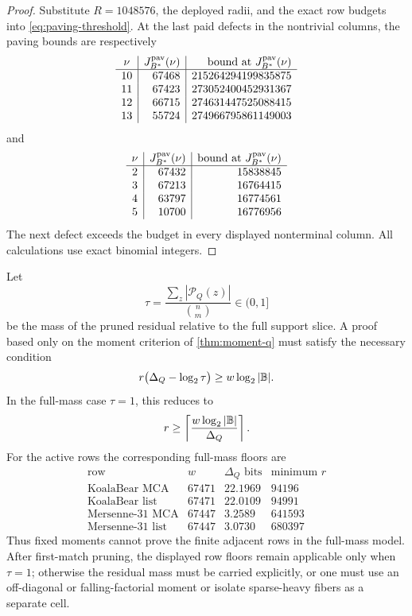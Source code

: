 \documentclass[11pt,a4paper]{amsart}
\numberwithin{equation}{section}
\theoremstyle{remark}
\begin{document}
\begin{proof}
Substitute \(R=1048576\), the deployed radii, and the exact row budgets
into \eqref{eq:paving-threshold}.  At the last paid defects in the nontrivial
columns, the paving bounds are respectively
\[
\begin{array}{c|r|r}
\nu&J_{B^*}^{\rm pav}(\nu)&\text{bound at }J_{B^*}^{\rm pav}(\nu)\\ \hline
10&67468&215264294199835875\\
11&67423&273052400452931367\\
12&66715&274631447525088415\\
13&55724&274966795861149003
\end{array}
\]
and
\[
\begin{array}{c|r|r}
\nu&J_{B^*}^{\rm pav}(\nu)&\text{bound at }J_{B^*}^{\rm pav}(\nu)\\ \hline
2&67432&15838845\\
3&67213&16764415\\
4&63797&16774561\\
5&10700&16776956
\end{array}
\]
The next defect exceeds the budget in every displayed nonterminal column.
All calculations use exact binomial integers.
\end{proof}

\begin{proposition}\label{prop:q-moment-order-floor}
Let
\[
        \tau=\frac{\sum_z|\mathcal P_Q(z)|}{\binom nm}\in(0,1]
\]
be the mass of the pruned residual relative to the full support slice.  A proof based only on the moment criterion of \cref{thm:moment-q} must satisfy the necessary condition
\[
        r\bigl(\Delta_Q-\log_2\tau\bigr)
        \ge w\log_2|\mathbb B| .
\]
In the full-mass case \(\tau=1\), this reduces to
\[
        r\ge\left\lceil\frac{w\log_2|\mathbb B|}{\Delta_Q}\right\rceil .
\]
For the active rows the corresponding full-mass floors are
\[
\begin{array}{c|r|r|r}
\text{row} & w & \Delta_Q\text{ bits} & \text{minimum }r\\
\hline
\text{KoalaBear MCA} & 67471 & 22.1969 & 94196\\
\text{KoalaBear list} & 67471 & 22.0109 & 94991\\
\text{Mersenne-31 MCA} & 67447 & 3.2589 & 641593\\
\text{Mersenne-31 list} & 67447 & 3.0730 & 680397
\end{array}
\]
Thus fixed moments cannot prove the finite adjacent rows in the full-mass model.  After first-match pruning, the displayed row floors remain applicable only when \(\tau=1\); otherwise the residual mass must be carried explicitly, or one must use an off-diagonal or falling-factorial moment or isolate sparse-heavy fibers as a separate cell.
\end{proposition}
\end{document}

